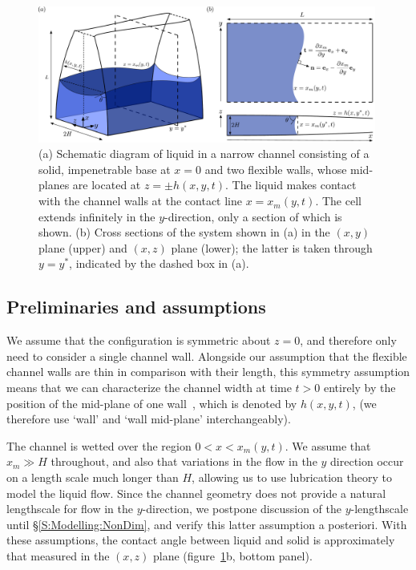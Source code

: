 \documentclass{jfm}
\begin{document}
\begin{figure}
\centering
\includegraphics[width=0.99\textwidth]{figures/fig4_schematic.pdf}
\caption{(a) Schematic diagram of liquid in a narrow channel consisting of a solid, impenetrable base at $x =0$ and two flexible walls, whose mid-planes are located at $z = \pm h(x,y,t)$. The liquid makes contact with the channel walls at the contact line $x = x_m(y,t)$. The cell extends infinitely in the $y$-direction, only a section of which is shown. (b) Cross sections of the system shown in (a) in the $(x,y)$ plane (upper) and $(x,z)$ plane (lower); the latter is taken through $y = y^*$, indicated by the dashed box in (a).}
\label{fig:Modelling:Schematic}
\end{figure}

\subsection{Preliminaries and assumptions}
We assume that the configuration is symmetric about $z = 0$, and therefore only need to consider a single channel wall. Alongside our assumption that the flexible channel walls are thin in comparison with their length, this symmetry assumption means that we can characterize the channel width at time $t > 0$ entirely by the position of the mid-plane of one wall~\citep{Reddy2006}, which is denoted by $h(x,y,t)$, (we therefore use `wall' and `wall mid-plane' interchangeably).

The channel is wetted over the region $0 < x < x_m(y,t)$. We assume that $x_m \gg H$ throughout, and also that variations in the flow in the $y$ direction occur on a length scale much longer than $H$, allowing us to use lubrication theory to model the liquid flow. Since the channel geometry does not provide a natural lengthscale for flow in the $y$-direction, we postpone discussion of the $y$-lengthscale until \S\ref{S:Modelling:NonDim}, and verify this latter assumption a posteriori. With these assumptions, the contact angle between liquid and solid is approximately that measured in the $(x,z)$ plane (figure~\ref{fig:Modelling:Schematic}b, bottom panel).
\end{document}
